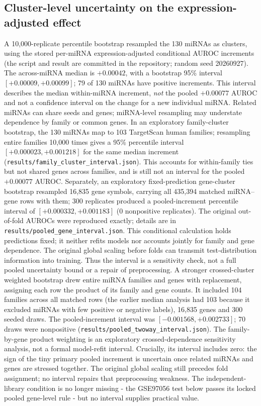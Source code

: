 \documentclass[11pt]{article}
\begin{document}
\subsection{Cluster-level uncertainty on the expression-adjusted effect}
A 10{,}000-replicate percentile bootstrap resampled the 130 miRNAs as
clusters, using the stored per-miRNA expression-adjusted conditional AUROC
increments (the script and result are committed in the repository;
random seed 20260927).
The across-miRNA median is $+0.00042$, with a bootstrap 95\% interval
$[+0.00009,+0.00099]$; 79 of 130 miRNAs have positive increments. This
interval describes the median within-miRNA increment, \emph{not} the pooled
$+0.00077$ AUROC and not a confidence interval on the change for a new
individual miRNA. Related miRNAs can share seeds and genes; miRNA-level
resampling may understate dependence by family or common genes. In an
exploratory family-cluster bootstrap, the 130 miRNAs map to 103 TargetScan
human families; resampling entire families 10{,}000 times gives a 95\%
percentile interval $[+0.000023,+0.001218]$ for the same median increment
(\texttt{results/family\_cluster\_interval.json}). This accounts for
within-family ties but not shared genes across families, and is still not
an interval for the pooled $+0.00077$ AUROC. Separately, an exploratory
fixed-prediction gene-cluster bootstrap resampled 16{,}835 gene symbols,
carrying all 435{,}394 matched miRNA--gene rows with them; 300 replicates
produced a pooled-increment percentile interval of
$[+0.000332,+0.001183]$ (0 nonpositive replicates).
The original out-of-fold AUROCs were reproduced exactly; details are in
\texttt{results/pooled\_gene\_interval.json}. This conditional calculation
holds predictions fixed; it neither refits models nor accounts jointly for
family and gene dependence. The original global scaling before folds can
transmit test-distribution information into training. Thus the interval
is a sensitivity check, not a full pooled uncertainty bound or a repair
of preprocessing. A stronger crossed-cluster weighted bootstrap drew entire
miRNA families and genes with replacement, assigning each row the product
of its family and gene counts. It included 104 families across all matched
rows (the earlier median analysis had 103 because it excluded miRNAs with
few positive or negative labels), 16{,}835 genes and 300 seeded draws.
The pooled-increment interval was $[-0.001568,+0.002733]$; 70 draws were
nonpositive (\texttt{results/pooled\_twoway\_interval.json}). The
family-by-gene product weighting is an exploratory crossed-dependence
sensitivity analysis, not a formal model-refit interval. Crucially, its
interval includes zero: the sign of the tiny primary pooled increment is
uncertain once related miRNAs and genes are stressed together. The original
global scaling still precedes fold assignment; no interval repairs that
preprocessing weakness. The independent-library condition is no longer missing - the
GSE97056 test below passes its locked pooled gene-level rule - but no
interval supplies practical value.
\end{document}
